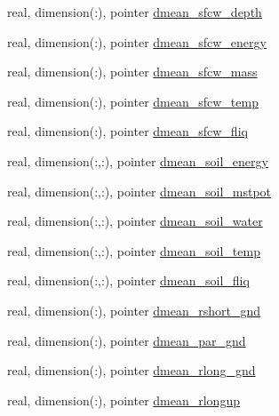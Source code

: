 \begin{DoxyCompactItemize}
\item 
real, dimension(\+:), pointer \hyperlink{structed__state__vars_1_1sitetype_a816df806765ac205cb5dfd80f0329810}{dmean\+\_\+sfcw\+\_\+depth}
\item 
real, dimension(\+:), pointer \hyperlink{structed__state__vars_1_1sitetype_ab7d69863cd8838986a11468bd44abc17}{dmean\+\_\+sfcw\+\_\+energy}
\item 
real, dimension(\+:), pointer \hyperlink{structed__state__vars_1_1sitetype_aff79aef6842a7087621600d28040493a}{dmean\+\_\+sfcw\+\_\+mass}
\item 
real, dimension(\+:), pointer \hyperlink{structed__state__vars_1_1sitetype_a85386290aa8d10c084a14be9a0340323}{dmean\+\_\+sfcw\+\_\+temp}
\item 
real, dimension(\+:), pointer \hyperlink{structed__state__vars_1_1sitetype_a12a977ed6dbf8f988bde17bb7a304306}{dmean\+\_\+sfcw\+\_\+fliq}
\item 
real, dimension(\+:,\+:), pointer \hyperlink{structed__state__vars_1_1sitetype_a86e6d53b21d3d01f5cda808aaa6bf0d4}{dmean\+\_\+soil\+\_\+energy}
\item 
real, dimension(\+:,\+:), pointer \hyperlink{structed__state__vars_1_1sitetype_a0bd3a944905fdfb6d4eff2a9005c851c}{dmean\+\_\+soil\+\_\+mstpot}
\item 
real, dimension(\+:,\+:), pointer \hyperlink{structed__state__vars_1_1sitetype_a0626b3f7e62bea9a1b95a3cc55944a5b}{dmean\+\_\+soil\+\_\+water}
\item 
real, dimension(\+:,\+:), pointer \hyperlink{structed__state__vars_1_1sitetype_ada44f3e1d1f65ba246276a0e8ffed7de}{dmean\+\_\+soil\+\_\+temp}
\item 
real, dimension(\+:,\+:), pointer \hyperlink{structed__state__vars_1_1sitetype_a5c8d4cf2013de2a895f721a060cfa565}{dmean\+\_\+soil\+\_\+fliq}
\item 
real, dimension(\+:), pointer \hyperlink{structed__state__vars_1_1sitetype_a0cb72c324de9f1b1c6acbacb723713f2}{dmean\+\_\+rshort\+\_\+gnd}
\item 
real, dimension(\+:), pointer \hyperlink{structed__state__vars_1_1sitetype_a84eb39480118065d7744110a5d5b752f}{dmean\+\_\+par\+\_\+gnd}
\item 
real, dimension(\+:), pointer \hyperlink{structed__state__vars_1_1sitetype_abd6f68aedb359e2bcf0e715699932af5}{dmean\+\_\+rlong\+\_\+gnd}
\item 
real, dimension(\+:), pointer \hyperlink{structed__state__vars_1_1sitetype_afe2aca1a3c7dad2f20c1bb7580e8a47d}{dmean\+\_\+rlongup}
\item 

\end{DoxyCompactItemize}
